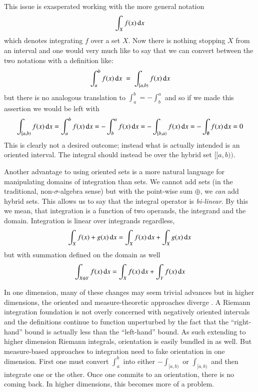 This issue is exasperated working with the more general notation
\begin{equation*}
	\int_X f(x) \mathop{}\!\mathrm{d} x
\end{equation*}
which denotes integrating $f$ over a set $X$.
Now there is nothing stopping $X$ from an interval and one would very much like to say that we can convert between the
two notations with a definition like:
\begin{equation*}
	\int_a^b f(x) \mathop{}\!\mathrm{d} x \;=\; \int_{[a,b)} f(x) \mathop{}\!\mathrm{d} x
\end{equation*}
but there is no analogous translation to $\int_a^b = - \int_b^a$ and so if we made this assertion we would be left with
\begin{equation*}
	\int_{[a,b)} f(x) \mathop{}\!\mathrm{d} x 
		= \int_a^b f(x) \mathop{}\!\mathrm{d} x 
		= -\int_b^a f(x) \mathop{}\!\mathrm{d} x 
		= - \int_{[b,a)} f(x)\mathop{}\!\mathrm{d} x 
		= -\int_\emptyset f(x)\mathop{}\!\mathrm{d} x 	
		= 0
\end{equation*}
This is clearly not a desired outcome; instead what is actually intended is an oriented interval.
The integral should instead be over the hybrid set $[\![a,b)\!)$.



Another advantage to using oriented sets is a more natural language for manipulating domains of integration than sets.
We cannot add sets (in the traditional, non-$\sigma$-algebra sense) 
but with the point-wise sum $\oplus$, we \emph{can} add hybrid sets.
This allows us to say that the integral operator is \emph{bi-linear}.
By this we mean, that integration is a function of two operands, the integrand and the domain.
Integration is linear over integrands regardless,
\begin{equation}
	\int_{X} f(x) + g(x) \mathop{}\!\mathrm{d} x = \int_X f(x) \mathop{}\!\mathrm{d} x + \int_X g(x) \mathop{}\!\mathrm{d} x
\end{equation}
but with summation defined on the domain as well
\begin{equation}
	\int_{X\oplus Y} f(x) \mathop{}\!\mathrm{d} x = \int_{X} f(x) \mathop{}\!\mathrm{d} x + \int_Y f(x) \mathop{}\!\mathrm{d} x
\end{equation}


In one dimension, many of these changes may seem trivial advances but in higher dimensions, 
the oriented and measure-theoretic approaches diverge \cite{tao2007differential}.
A Riemann integration foundation is not overly concerned with negatively oriented intervals and the definitions continue
to function unperturbed by the fact that the ``right-hand'' bound is actually less than the ``left-hand'' bound.
As such extending to higher dimension Riemann integrals, orientation is easily bundled in as well.
But measure-based approaches to integration need to fake orientation in one dimension.
First one must convert $\int_a^b$ into either $-\int_{[a,b)}$ or $\int_{[a,b)}$ and then integrate one or the other.
Once one commits to an orientation, there is no coming back.
In higher dimensions, this becomes more of a problem.


